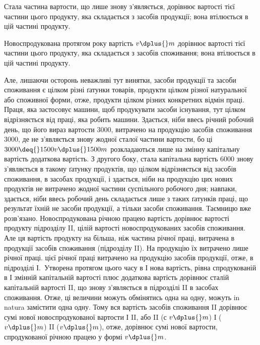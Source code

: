 
Стала частина вартости, що лише знову з’являється, дорівнює вартості
тієї частини цього продукту, яка складається з засобів продукції;
вона втілюється в цій частині продукту.

Новоспродукована протягом року вартість \deq{} $v \dplus{} m$ дорівнює вартості
тієї частини цього продукту, яка складається з засобів споживання;
вона втілюється в цій частині продукту.

Але, лишаючи осторонь неважливі тут винятки, засоби продукції та
засоби споживання є цілком різні ґатунки товарів, продукти цілком різної
натуральної або споживної форми, отже, продукти цілком різних конкретних
відмін праці. Праця, яка застосовує машини, щоб продукувати
засоби існування, тут цілком відрізняється від праці, яка робить машини.
Здається, ніби ввесь річний робочий день, що його вираз вартости \deq{} 3000,
витрачено на продукцію засобів споживання \deq{} 3000, де не з’являється
знову жодної сталої частини вартости, бо ці $3000 \deq{} 1500 v \dplus{} 1500 m$
розкладаються лише на змінну капітальну вартість \dplus{} додаткова вартість. З
другого боку, стала капітальна вартість \deq{} 6000 знову з’являється в такому
ґатунку продуктів, що цілком відрізняється від засобів споживання,
в засобах продукції, і здається, ніби на продукцію цих нових продуктів
не витрачено жодної частини суспільного робочого дня; навпаки, здається,
ніби ввесь робочий день складається лише з таких ґатунків праці, що
результат їхній не засоби продукції, а тільки засоби споживання. Таємницю
вже розв’язано. Новоспродукована річною працею вартість дорівнює
вартості продукту підрозділу II, цілій вартості новоспродукованих засобів
споживання. Але ця вартість продукту на  більша, ніж частина річної
праці, витрачена в продукції засобів споживання (підрозділу II). На продукцію
їх витрачено лише  річної праці.  цієї річної праці витрачено
на продукцію засобів продукції, отже, в підрозділі І.~Утворена протягом
цього часу в І нова вартість, рівна спродукованій в І змінній капітальній
вартості плюс додаткова вартість дорівнює сталій капітальній вартості II,
що знову з’являється в підрозділі II в засобах споживання. Отже, ці величини
можуть обмінятись одна на одну, можуть in natura замістити одна одну.
Тому вся вартість засобів споживання II дорівнює сумі нової новоспродукованої
вартости І \dplus{} II, або II (с \dplus{} $v \dplus{} m$) \deq{} І ($v \dplus{} m$) \dplus{} II ($v \dplus{} m$), отже, дорівнює
сумі нової вартости, спродукованої річною працею у формі $v \dplus{} m$.

